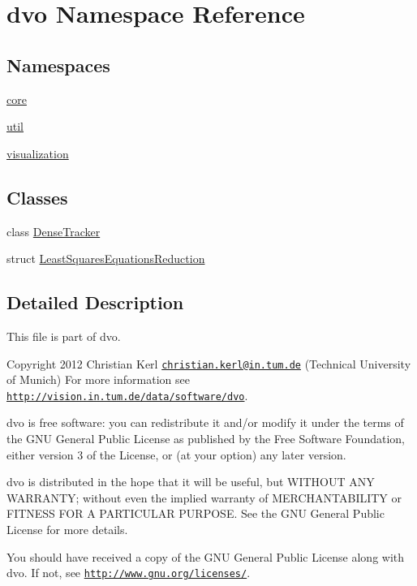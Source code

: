 \hypertarget{namespacedvo}{}\section{dvo Namespace Reference}
\label{namespacedvo}
\subsection*{Namespaces}
\begin{DoxyCompactItemize}
\item 
 \mbox{\hyperlink{namespacedvo_1_1core}{core}}
\item 
 \mbox{\hyperlink{namespacedvo_1_1util}{util}}
\item 
 \mbox{\hyperlink{namespacedvo_1_1visualization}{visualization}}
\end{DoxyCompactItemize}
\subsection*{Classes}
\begin{DoxyCompactItemize}
\item 
class \mbox{\hyperlink{classdvo_1_1_dense_tracker}{Dense\+Tracker}}
\item 
struct \mbox{\hyperlink{structdvo_1_1_least_squares_equations_reduction}{Least\+Squares\+Equations\+Reduction}}
\end{DoxyCompactItemize}


\subsection{Detailed Description}
This file is part of dvo.

Copyright 2012 Christian Kerl \href{mailto:christian.kerl@in.tum.de}{\tt christian.\+kerl@in.\+tum.\+de} (Technical University of Munich) For more information see \href{http://vision.in.tum.de/data/software/dvo}{\tt http\+://vision.\+in.\+tum.\+de/data/software/dvo}.

dvo is free software\+: you can redistribute it and/or modify it under the terms of the G\+NU General Public License as published by the Free Software Foundation, either version 3 of the License, or (at your option) any later version.

dvo is distributed in the hope that it will be useful, but W\+I\+T\+H\+O\+UT A\+NY W\+A\+R\+R\+A\+N\+TY; without even the implied warranty of M\+E\+R\+C\+H\+A\+N\+T\+A\+B\+I\+L\+I\+TY or F\+I\+T\+N\+E\+SS F\+OR A P\+A\+R\+T\+I\+C\+U\+L\+AR P\+U\+R\+P\+O\+SE. See the G\+NU General Public License for more details.

You should have received a copy of the G\+NU General Public License along with dvo. If not, see \href{http://www.gnu.org/licenses/}{\tt http\+://www.\+gnu.\+org/licenses/}. 